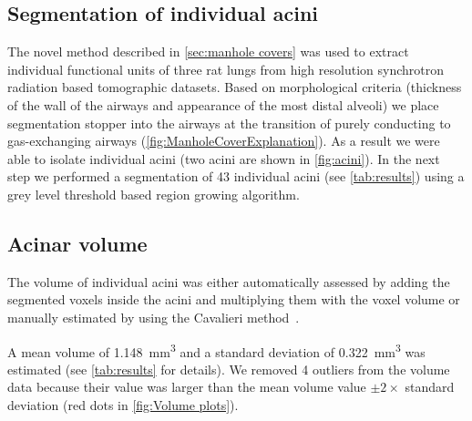 \documentclass[final,paper=a4,DIV=calc,abstract,english]{scrartcl}
\newcommand{\numberofacini}{43\xspace}
\newcommand{\biggerthan}{2\xspace} %
\newcommand{\meanacinarvolume}{1.148} %
\newcommand{\meanacinarvolumeSTD}{0.322} %
\begin{document}
\subsection{Segmentation of individual acini}
The novel method described in \autoref{sec:manhole covers} was used to extract individual functional units of three rat lungs from high resolution synchrotron radiation based tomographic datasets.
Based on morphological criteria (thickness of the wall of the airways and appearance of the most distal alveoli) we place segmentation stopper into the airways at the transition of purely conducting to gas-exchanging airways (\autoref{fig:ManholeCoverExplanation}).
As a result we were able to isolate individual acini (two acini are shown in \autoref{fig:acini}).
In the next step we performed a segmentation of \numberofacini individual acini (see \autoref{tab:results}) using a grey level threshold based region growing algorithm.


\subsection{Acinar volume}
The volume of individual acini was either automatically assessed by adding the segmented voxels inside the acini and multiplying them with the voxel volume or manually estimated by using the Cavalieri method~.

A mean  volume of \SI{\meanacinarvolume}{\milli\meter\cubed} and a standard deviation of \SI{\meanacinarvolumeSTD}{\milli\meter\cubed} was estimated (see \autoref{tab:results} for details).
We removed 4 outliers from the volume data because their value was larger than the mean volume value \(\pm\biggerthan\times\) standard deviation (red dots in \autoref{fig:Volume plots}).
\end{document}
